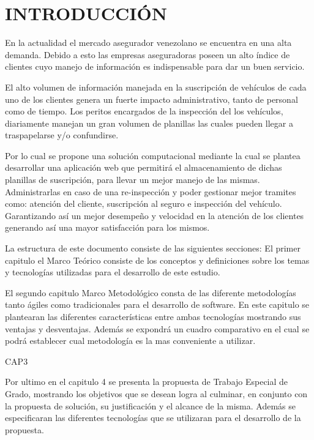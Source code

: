 \chapter*{INTRODUCCIÓN}


\setlength{\parskip}{5mm}
En la actualidad el mercado asegurador venezolano se encuentra en una alta demanda. Debido a esto las empresas aseguradoras poseen un alto índice de clientes cuyo manejo de información es indispensable para dar un buen servicio.

El alto volumen de información manejada en la suscripción de vehículos de cada uno de los clientes genera un fuerte impacto administrativo, tanto de personal como de tiempo. Los peritos encargados de la inspección del los vehículos, diariamente manejan un gran volumen de planillas las cuales pueden llegar a traspapelarse y/o confundirse.

Por lo cual se propone una solución computacional mediante la cual se plantea desarrollar una aplicación web que permitirá el almacenamiento de dichas planillas de suscripción, para llevar un mejor manejo de las mismas. Administrarlas en caso de una re-inspección y poder gestionar mejor tramites como: atención del cliente, suscripción al seguro e inspección del vehículo. Garantizando así un mejor desempeño y velocidad en la atención de los clientes generando así una mayor satisfacción para los mismos.


La estructura de este documento consiste de las siguientes secciones: El primer capitulo el Marco Teórico consiste de los conceptos y definiciones sobre los temas y tecnologías utilizadas para el desarrollo de este estudio. 

El segundo capitulo Marco Metodológico consta de las diferente metodologías tanto ágiles como tradicionales para el desarrollo de software. En este capitulo se plantearan las diferentes características entre ambas tecnologías mostrando sus ventajas y desventajas. Además se expondrá un cuadro comparativo en el cual se podrá establecer cual metodología es la mas conveniente a utilizar.


CAP3

Por ultimo en el capitulo 4 se presenta la propuesta de Trabajo Especial de Grado, mostrando los objetivos que se desean logra al culminar, en conjunto con la propuesta de solución, su justificación y el alcance de la misma. Además se especificaran las diferentes tecnologías que se utilizaran para el desarrollo de la propuesta.
\setlength{\parskip}{0mm}